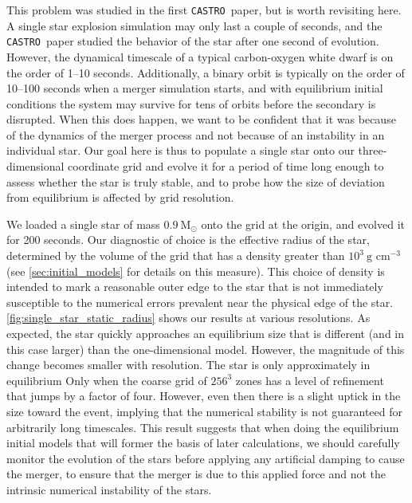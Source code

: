 \documentclass[iop]{../emulateapj}
\newcommand{\msolar}{\mathrm{M}_\odot}
\newcommand{\castro}{\texttt{CASTRO}}
\begin{document}
This problem was studied in the first \castro\ paper, but is worth
revisiting here. A single star explosion simulation may only last a
couple of seconds, and the \castro\ paper studied the behavior of the
star after one second of evolution. However, the dynamical timescale
of a typical carbon-oxygen white dwarf is on the order of 1--10
seconds. Additionally, a binary orbit is typically on the order of
10--100 seconds when a merger simulation starts, and with equilibrium
initial conditions the system may survive for tens of orbits before
the secondary is disrupted. When this does happen, we want to be
confident that it was because of the dynamics of the merger process
and not because of an instability in an individual star. Our goal here
is thus to populate a single star onto our three-dimensional
coordinate grid and evolve it for a period of time long enough to
assess whether the star is truly stable, and to probe how the size of
deviation from equilibrium is affected by grid resolution.

We loaded a single star of mass $0.9\ \msolar$ onto the grid at the origin, 
and evolved it for 200 seconds. Our diagnostic of choice is the effective 
radius of the star, determined by the volume of the grid that has a density 
greater than $10^3\ \text{g cm}^{-3}$ (see \autoref{sec:initial_models} 
for details on this measure). This choice of density is intended to 
mark a reasonable outer edge to the star that is not immediately susceptible 
to the numerical errors prevalent near the physical edge of the star. 
\autoref{fig:single_star_static_radius} shows our results at various resolutions. 
As expected, the star quickly approaches an equilibrium size that is different 
(and in this case larger) than the one-dimensional model. However, the magnitude 
of this change becomes smaller with resolution. The star is only approximately 
in equilibrium Only when the coarse grid of $256^3$ zones has a level of 
refinement that jumps by a factor of four. However, even then there is a slight 
uptick in the size toward the event, implying that the numerical stability 
is not guaranteed for arbitrarily long timescales. This result suggests that when 
doing the equilibrium initial models that will former the basis of later calculations,
we should carefully monitor the evolution of the stars before applying any 
artificial damping to cause the merger, to ensure that the merger is due to 
this applied force and not the intrinsic numerical instability of the stars.
\end{document}
